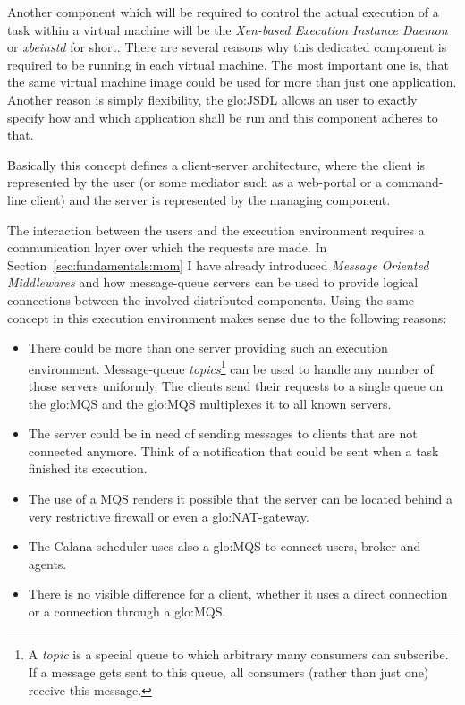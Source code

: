 Another component which  will be required to control  the actual execution
of a task  within a virtual machine will  be the \emph{Xen-based Execution
  Instance Daemon} or \emph{xbeinstd} for short. There are several reasons
why this  dedicated component  is required to  be running in  each virtual
machine. The  most important one is,  that the same  virtual machine image
could  be used  for more  than just  one application.   Another  reason is
simply flexibility,  the \gls{glo:JSDL} allows an user  to exactly specify
how and which application shall be run and this component adheres to that.

\bigskip

Basically  this concept  defines a  client-server architecture,  where the
client is represented  by the user (or some mediator  such as a web-portal
or a  command-line client) and the  server is represented  by the managing
component.

The interaction between the users and the execution environment requires a
communication   layer   over   which    the   requests   are   made.    In
Section~\ref{sec:fundamentals:mom} I have already introduced \emph{Message
  Oriented  Middlewares} and  how  message-queue servers  can  be used  to
provide logical  connections between the  involved distributed components.
Using the  same concept in this  execution environment makes  sense due to
the following reasons:

\begin{itemize}
\item  There could be  more than  one server  providing such  an execution
  environment.   Message-queue \emph{topics}\footnote{A \emph{topic}  is a
    special queue to  which arbitrary many consumers can  subscribe.  If a
    message gets sent to this  queue, all consumers (rather than just one)
    receive  this message.}  can  be used  to handle  any number  of those
  servers uniformly. The clients send  their requests to a single queue on
  the  \gls{glo:MQS} and  the \gls{glo:MQS}  multiplexes it  to  all known
  servers.
\item The server could be in  need of sending messages to clients that are
  not connected anymore. Think of a notification that could be sent when a
  task finished its execution.
\item The use of a MQS renders  it possible that the server can be located
  behind a very restrictive firewall or even a \gls{glo:NAT}-gateway.
\item The  Calana scheduler  uses also a  \gls{glo:MQS} to  connect users,
  broker and agents.
\item  There is  no visible  difference for  a client,  whether it  uses a
  direct connection or a connection through a \gls{glo:MQS}.
\end{itemize}

